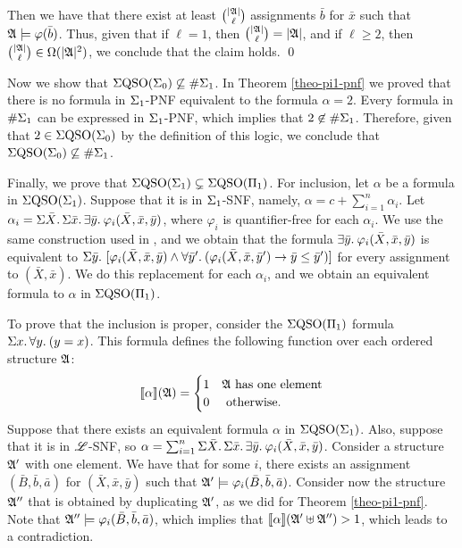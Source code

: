 Then we have that there exist at least $\binom{\vert \mathfrak{A} \vert}{\ell}$ assignments $\bar b$ for $\bar{x}$ such that $\mathfrak{A}\models\varphi(\bar{b})$. Thus, given that if $\ell = 1$, then $\binom{\vert \mathfrak{A} \vert}{\ell} = \vert \mathfrak{A} \vert$, and if $\ell \geq 2$, then $\binom{\vert \mathfrak{A} \vert}{\ell} \in \Omega(\vert \mathfrak{A} \vert^2)$, we conclude that the claim holds.
\qed

Now we show that $\Sigma{\rm QSO}(\Sigma_{0}) \not\subseteq \#\Sigma_{1}$. 
In Theorem \ref{theo-pi1-pnf} we proved that there is no formula in $\Sigma_{1}$-PNF equivalent to the formula $\alpha = 2$. 
Every formula in $\#\Sigma_{1}$ can be expressed in $\Sigma_{1}$-PNF, which implies that $2 \not\in \#\Sigma_{1}$. Therefore, given that $2 \in \Sigma{\rm QSO}(\Sigma_{0})$ by the definition of this logic, we conclude that $\Sigma{\rm QSO}(\Sigma_{0}) \not\subseteq \#\Sigma_{1}$.

Finally, we prove that $\Sigma{\rm QSO}(\Sigma_{1})\subsetneq\Sigma{\rm QSO}(\Pi_{1})$. 
For inclusion, let $\alpha$ be a formula in $\Sigma{\rm QSO}(\Sigma_{1})$. 
Suppose that it is in $\Sigma_{1}$-SNF, namely, $\alpha = c + \sum_{i = 1}^{n}\alpha_i$. 
Let $\alpha_i = \Sigma{\bar{X}}.\,\Sigma{\bar{x}}.\,\exists{\bar{y}}.\:\varphi_i(\bar{X},\bar{x},\bar{y})$, where $\varphi_i$ is quantifier-free for each $\alpha_i$. 
We use the same construction used in \cite{SalujaST95}, and we obtain that the formula $\exists{\bar{y}}.\:\varphi_i(\bar{X},\bar{x},\bar{y})$ is equivalent to $\Sigma{\bar{y}}.\,\,[\varphi_i(\bar{X},\bar{x},\bar{y}) \wedge \forall{\bar{y}'}.\:(\varphi_i(\bar{X},\bar{x},\bar{y}')\to\bar{y}\leq\bar{y}')]$ for every assignment to $(\bar{X},\bar{x})$. 
We do this replacement for each $\alpha_i$, and we obtain an equivalent formula to $\alpha$ in $\Sigma{\rm QSO}(\Pi_{1})$.

To prove that the inclusion is proper, consider the $\Sigma{\rm QSO}(\Pi_{1})$ formula $\Sigma{x}.\, \forall{y}.\:(y = x)$. 
This formula defines the following function over each ordered structure $\mathfrak{A}$:
$$
{\llbracket{}{\alpha}\rrbracket}(\mathfrak{A}) = 
\begin{cases}
1 &\mathfrak{A} \text{ has one element}\\
0 &\text{ otherwise}.
\end{cases}
$$
Suppose that there exists an equivalent formula $\alpha$ in $\Sigma{\rm QSO}(\Sigma_{1})$. 
Also, suppose that it is in $\mathscr{L}$-SNF, so $\alpha = \sum_{i = 1}^n\Sigma{\bar{X}}.\,\Sigma{\bar{x}}.\,\exists{\bar{y}}.\:\varphi_i(\bar{X},\bar{x},\bar{y})$. 
Consider a structure $\mathfrak{A}'$ with one element. 
We have that for some $i$, there exists an assignment $(\bar{B},\bar{b},\bar{a})$ for $(\bar{X},\bar{x},\bar{y})$ such that $\mathfrak{A}' \models\varphi_i(\bar{B},\bar{b},\bar{a})$. 
Consider now the structure $\mathfrak{A}''$ that is obtained by duplicating $\mathfrak{A}'$, as we did for Theorem \ref{theo-pi1-pnf}. 
Note that $\mathfrak{A}''\models\varphi_i(\bar{B},\bar{b},\bar{a})$, which implies that ${\llbracket{}{\alpha}\rrbracket}(\mathfrak{A}' \uplus \mathfrak{A}'') > 1$, which leads to a contradiction.
